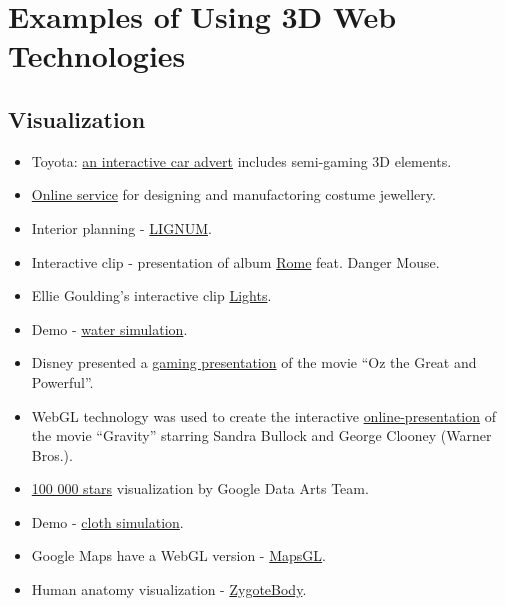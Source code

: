 \documentclass[a4paper,12pt,oneside]{sphinxmanual}
\begin{document}
\section{Examples of Using 3D Web Technologies}
\label{about:index-11}\label{about:id14}\label{about:web3d-examples}

\subsection{Visualization}
\label{about:id15}\begin{itemize}
\item {} 
Toyota: \href{http://www.toyota.com/itsacar/}{an interactive car advert} includes semi-gaming 3D elements.

\item {} 
\href{http://n-e-r-v-o-u-s.com/cellCycle/}{Online service} for designing and manufactoring costume jewellery.

\item {} 
Interior planning - \href{http://www.spacegoo.com/lignum/index.php?constructor=Demo1}{LIGNUM}.

\item {} 
Interactive clip - presentation of album \href{http://www.ro.me/}{Rome} feat. Danger Mouse.

\item {} 
Ellie Goulding's interactive clip \href{http://lights.elliegoulding.com/}{Lights}.

\item {} 
Demo - \href{http://www.chromeexperiments.com/detail/webgl-water-simulation/}{water simulation}.

\item {} 
Disney presented a \href{http://www.findyourwaytooz.com/}{gaming presentation} of the movie ``Oz the Great and Powerful''.

\item {} 
WebGL technology was used to create the interactive \href{http://gravitymovie.warnerbros.com/}{online-presentation} of the movie ``Gravity'' starring Sandra Bullock and George Clooney (Warner Bros.).

\item {} 
\href{http://workshop.chromeexperiments.com/stars/}{100 000 stars} visualization by Google Data Arts Team.

\item {} 
Demo - \href{http://www.kamibu.com/demos/cloth-simulation/}{cloth simulation}.

\item {} 
Google Maps have a WebGL version - \href{http://maps.google.com/}{MapsGL}.

\item {} 
Human anatomy visualization - \href{http://www.zygotebody.com/}{ZygoteBody}.

\end{itemize}
\end{document}
